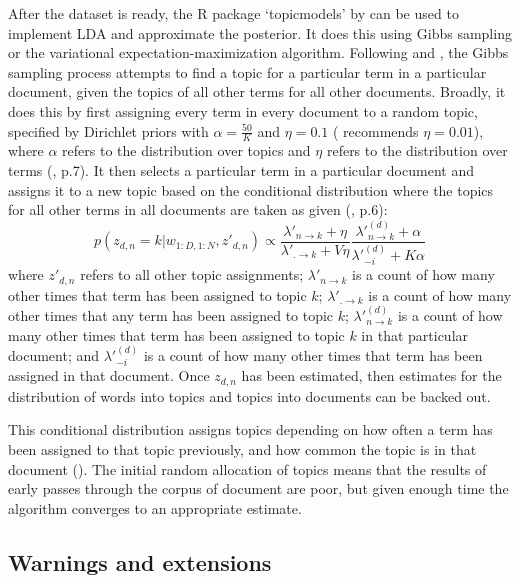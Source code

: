 \documentclass[
]{book}
\begin{document}
After the dataset is ready, the R package `topicmodels' by \citet{Grun2011} can be used to implement LDA and approximate the posterior. It does this using Gibbs sampling or the variational expectation-maximization algorithm. Following \citet{SteyversGriffiths2006} and \citet{Darling2011}, the Gibbs sampling process attempts to find a topic for a particular term in a particular document, given the topics of all other terms for all other documents. Broadly, it does this by first assigning every term in every document to a random topic, specified by Dirichlet priors with \(\alpha = \frac{50}{K}\) and \(\eta = 0.1\) (\citet{SteyversGriffiths2006} recommends \(\eta = 0.01\)), where \(\alpha\) refers to the distribution over topics and \(\eta\) refers to the distribution over terms (\citet{Grun2011}, p.7). It then selects a particular term in a particular document and assigns it to a new topic based on the conditional distribution where the topics for all other terms in all documents are taken as given (\citet{Grun2011}, p.6):
\[p(z_{d, n}=k | w_{1:D, 1:N}, z'_{d, n}) \propto \frac{\lambda'_{n\rightarrow k}+\eta}{\lambda'_{.\rightarrow k}+V\eta} \frac{\lambda'^{(d)}_{n\rightarrow k}+\alpha}{\lambda'^{(d)}_{-i}+K\alpha} \]
where \(z'_{d, n}\) refers to all other topic assignments; \(\lambda'_{n\rightarrow k}\) is a count of how many other times that term has been assigned to topic \(k\); \(\lambda'_{.\rightarrow k}\) is a count of how many other times that any term has been assigned to topic \(k\); \(\lambda'^{(d)}_{n\rightarrow k}\) is a count of how many other times that term has been assigned to topic \(k\) in that particular document; and \(\lambda'^{(d)}_{-i}\) is a count of how many other times that term has been assigned in that document. Once \(z_{d,n}\) has been estimated, then estimates for the distribution of words into topics and topics into documents can be backed out.

This conditional distribution assigns topics depending on how often a term has been assigned to that topic previously, and how common the topic is in that document (\citet{SteyversGriffiths2006}). The initial random allocation of topics means that the results of early passes through the corpus of document are poor, but given enough time the algorithm converges to an appropriate estimate.

\hypertarget{warnings-and-extensions}{%
\subsection{Warnings and extensions}\label{warnings-and-extensions}}
\end{document}
